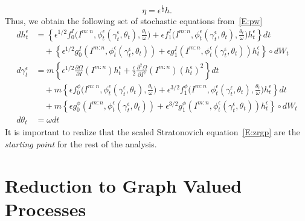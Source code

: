 \[
\eta = \epsilon^\frac12 h.
\]
Thus, we obtain the following set of stochastic equations from~\eqref{E:pw}
\begin{equation}
\begin{aligned}
d h_t^\epsilon &= \left\{\epsilon^{1/2} f^I_0\Big(I^{m:n},\phi_t^\epsilon(\gamma_t^\epsilon,\theta_t),\frac{\theta_t}{\omega}\Big)
 + \epsilon f^I_1 \Big(I^{m:n}, \phi_t^\epsilon(\gamma_t^\epsilon, \theta_t), \frac{\theta_t}{\omega}\Big) h_t^\epsilon \right\} dt\\
&\quad + \left\{\epsilon^{1/2} g^I_0(I^{m:n}, \phi_t^\epsilon(\gamma_t^\epsilon, \theta_t)) + \epsilon g^I_1(I^{m:n},\phi_t^\epsilon(\gamma_t^\epsilon,\theta_t)) {h}_t^\epsilon\right\} \circ dW_t\\
d \gamma_t^\epsilon &= m \left\{ \epsilon^{1/2} \frac{\partial \Omega}{\partial I} (I^{m:n}) {h}_t^\epsilon + \frac{\epsilon}{2}\frac{\partial^2 \Omega}{\partial I^2} (I^{m:n}) ({h}_t^\epsilon)^2 \right\} dt\\
&\quad + m \left\{ \epsilon f^\phi_0\Big(I^{m:n},\phi_t^\epsilon(\gamma_t^\epsilon,\theta_t),\frac{\theta_t}{\omega}\Big) + \epsilon^{3/2} f^{\phi}_1\Big(I^{m:n},\phi_t^\epsilon(\gamma_t^\epsilon,\theta_t),\frac{\theta_t}{\omega}\Big) h_t^\epsilon \right\} d t\\
&\quad + m \left\{\epsilon g^{\phi}_0(I^{m:n}, \phi_t^\epsilon(\gamma_t^\epsilon, \theta_t)) + \epsilon^{3/2} g^\phi_1(I^{m:n},\phi_t^\epsilon(\gamma_t^\epsilon,\theta_t)) h_t^\epsilon\right\} \circ dW_t\\
d {\theta}_t &= \omega dt
\end{aligned}\label{E:zrgp}
\end{equation}
It is important to realize that the scaled Stratonovich
equation~\eqref{E:zrgp} are the \emph{starting point} for the
rest of the analysis.

\section{Reduction to Graph Valued Processes}
\label{S:reduction}

